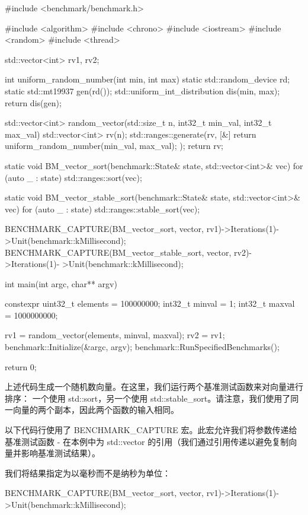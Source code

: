 \begin{cpp}
#include <benchmark/benchmark.h>

#include <algorithm>
#include <chrono>
#include <iostream>
#include <random>
#include <thread>

std::vector<int> rv1, rv2;

int uniform_random_number(int min, int max) {
    static std::random_device rd;
    static std::mt19937 gen(rd());
    std::uniform_int_distribution dis(min, max);
    return dis(gen);
}

std::vector<int> random_vector(std::size_t n, int32_t min_val, int32_t
max_val) {
    std::vector<int> rv(n);
    std::ranges::generate(rv, [&] {
        return uniform_random_number(min_val, max_val);
    });
    return rv;
}

static void BM_vector_sort(benchmark::State& state, std::vector<int>&
vec) {
    for (auto _ : state) {
        std::ranges::sort(vec);
    }
}

static void BM_vector_stable_sort(benchmark::State& state,
std::vector<int>& vec) {
    for (auto _ : state) {
        std::ranges::stable_sort(vec);
    }
}

BENCHMARK_CAPTURE(BM_vector_sort, vector, rv1)->Iterations(1)-
>Unit(benchmark::kMillisecond);
BENCHMARK_CAPTURE(BM_vector_stable_sort, vector, rv2)->Iterations(1)-
>Unit(benchmark::kMillisecond);

int main(int argc, char** argv) {
    constexpr uint32_t elements = 100000000;
    int32_t minval = 1;
    int32_t maxval = 1000000000;

    rv1 = random_vector(elements, minval, maxval);
    rv2 = rv1;
    benchmark::Initialize(&argc, argv);
    benchmark::RunSpecifiedBenchmarks();

    return 0;
}
\end{cpp}

上述代码生成一个随机数向量。在这里，我们运行两个基准测试函数来对向量进行排序： 一个使用 std::sort，另一个使用 std::stable\_sort。请注意，我们使用了同一向量的两个副本，因此两个函数的输入相同。

以下代码行使用了 BENCHMARK\_CAPTURE 宏。此宏允许我们将参数传递给基准测试函数 - 在本例中为 std::vector 的引用（我们通过引用传递以避免复制向量并影响基准测试结果）。

我们将结果指定为以毫秒而不是纳秒为单位：

\begin{cpp}
BENCHMARK_CAPTURE(BM_vector_sort, vector, rv1)->Iterations(1)-
>Unit(benchmark::kMillisecond);
\end{cpp}

